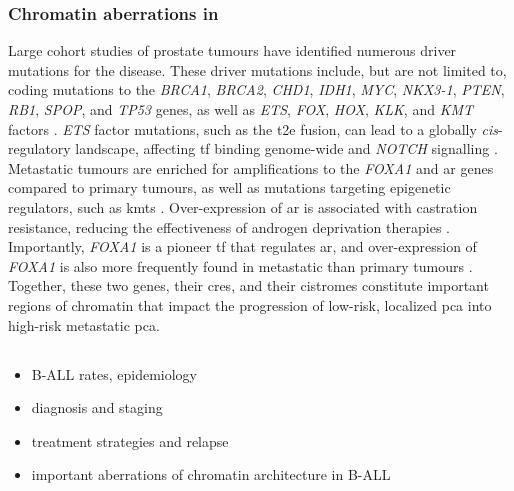 \subsubsection{Chromatin aberrations in }

Large cohort studies of prostate tumours have identified numerous driver mutations for the disease.
These driver mutations include, but are not limited to, coding mutations to the \emph{BRCA1}, \emph{BRCA2}, \emph{CHD1}, \emph{IDH1}, \emph{MYC}, \emph{NKX3-1}, \emph{PTEN}, \emph{RB1}, \emph{SPOP}, and \emph{TP53} genes, as well as \emph{ETS}, \emph{FOX}, \emph{HOX}, \emph{KLK}, and \emph{KMT} factors \cite{fraserGenomicHallmarksLocalized2017,pcf/su2cinternationalprostatecancerdreamteamLongTailOncogenic2018,abeshouseMolecularTaxonomyPrimary2015}.
\emph{ETS} factor mutations, such as the \gls{t2e} fusion, can lead to a globally \emph{cis}-regulatory landscape, affecting \gls{tf} binding genome-wide and \emph{NOTCH} signalling \cite{kronTMPRSS2ERGFusion2017}.
Metastatic tumours are enriched for amplifications to the \emph{FOXA1} and \gls{ar} genes compared to primary tumours, as well as mutations targeting epigenetic regulators, such as \glspl{kmt} \cite{grassoMutationalLandscapeLethal2012,robinsonIntegrativeClinicalGenomics2015,quigleyGenomicHallmarksStructural2018}.
Over-expression of \gls{ar} is associated with castration resistance, reducing the effectiveness of androgen deprivation therapies \cite{}.
Importantly, \emph{FOXA1} is a pioneer \gls{tf} that regulates \gls{ar}, and over-expression of \emph{FOXA1} is also more frequently found in metastatic than primary tumours \cite{tengPioneerProstateCancer2021}.
Together, these two genes, their \glspl{cre}, and their cistromes constitute important regions of chromatin that impact the progression of low-risk, localized \gls{pca} into high-risk metastatic \gls{pca}.

\subsection{}

\begin{itemize}
  \item B-ALL rates, epidemiology
  \item diagnosis and staging
  \item treatment strategies and relapse
  \item important aberrations of chromatin architecture in B-ALL
\end{itemize}

